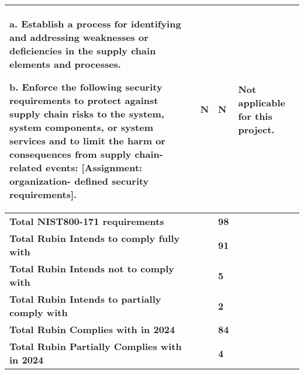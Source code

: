 \begin{longtable} {|p{}|p{}|p{}|p{} |}
{a. Establish a process for identifying and addressing weaknesses or deficiencies in the supply chain elements and processes.

b. Enforce the following security requirements to protect against supply chain risks to the system, system components, or system services and to limit the harm or consequences from supply chain-related events: [Assignment: organization- defined security requirements].}&{N}&{N}&{Not applicable for this project.} \\ \hline
\textbf{Total NIST800-171 requirements}&\textbf{}&\textbf{98}& \\ \hline
\textbf{Total Rubin Intends to comply fully with }&\textbf{}&\textbf{91}& \\ \hline
\textbf{Total Rubin Intends not to comply with }&\textbf{}&\textbf{5}& \\ \hline
\textbf{Total Rubin Intends to partially comply with }&\textbf{}&\textbf{2}& \\ \hline
\textbf{Total Rubin Complies with in 2024}&\textbf{}&\textbf{84}& \\ \hline
\textbf{Total Rubin Partially Complies with in 2024}&\textbf{}&\textbf{4}& \\ \hline
\end{longtable} \normalsize

